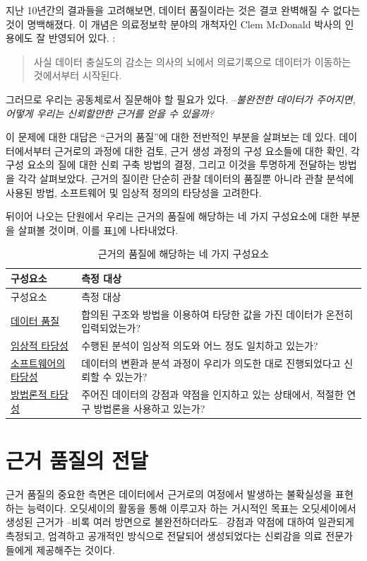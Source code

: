 \documentclass[11pt]{book}
\theoremstyle{definition}
\theoremstyle{definition}
\theoremstyle{definition}
\theoremstyle{remark}
\begin{document}
지난 10년간의 결과들을 고려해보면, 데이터 품질이라는 것은 결코 완벽해질
수 없다는 것이 명백해졌다. 이 개념은 의료정보학 분야의 개척자인 Clem
McDonald 박사의 인용에도 잘 반영되어 있다. :

\begin{quote}
사실 데이터 충실도의 감소는 의사의 뇌에서 의료기록으로 데이터가 이동하는
것에서부터 시작된다. 
\end{quote}

그러므로 우리는 공동체로서 질문해야 할 필요가 있다. --\emph{불완전한
데이터가 주어지면, 어떻게 우리는 신뢰할만한 근거를 얻을 수 있을까?}

이 문제에 대한 대답은 ``근거의 품질''에 대한 전반적인 부분을 살펴보는 데
있다. 데이터에서부터 근거로의 과정에 대한 검토, 근거 생성 과정의 구성
요소들에 대한 확인, 각 구성 요소의 질에 대한 신뢰 구축 방법의 결정,
그리고 이것을 투명하게 전달하는 방법을 각각 살펴보았다. 근거의 질이란
단순히 관찰 데이터의 품질뿐 아니라 관찰 분석에 사용된 방법, 소프트웨어
및 임상적 정의의 타당성을 고려한다. 

뒤이어 나오는 단원에서 우리는 근거의 품질에 해당하는 네 가지 구성요소에
대한 부분을 살펴볼 것이며, 이를 표\ref{tab:evidenceQuality}에
나타내었다.

\begin{longtable}[]{@{}ll@{}}
\caption{\label{tab:evidenceQuality} 근거의 품질에 해당하는 네 가지
구성요소}\tabularnewline
\toprule
구성요소 & 측정 대상\tabularnewline
\midrule
\endfirsthead
\toprule
구성요소 & 측정 대상\tabularnewline
\midrule
\endhead
\href{DataQuality.html}{데이터 품질} & 합의된 구조와 방법을 이용하여
타당한 값을 가진 데이터가 온전히 입력되었는가?\tabularnewline
\href{ClinicalValidity.html}{임상적 타당성} & 수행된 분석이 임상적
의도와 어느 정도 일치하고 있는가?\tabularnewline
\href{SoftwareValidity.html}{소프트웨어의 타당성} & 데이터의 변환과 분석
과정이 우리가 의도한 대로 진행되었다고 신뢰할 수 있는가?\tabularnewline
\href{MethodValidity.html}{방법론적 타당성} & 주어진 데이터의 강점과
약점을 인지하고 있는 상태에서, 적절한 연구 방법론을 사용하고
있는가?\tabularnewline
\bottomrule
\end{longtable}

\section{근거 품질의 전달}\label{--}

근거 품질의 중요한 측면은 데이터에서 근거로의 여정에서 발생하는
불확실성을 표현하는 능력이다. 오딧세이의 활동을 통해 이루고자 하는
거시적인 목표는 오딧세이에서 생성된 근거가 --비록 여러 방면으로
불완전하더라도-- 강점과 약점에 대하여 일관되게 측정되고, 엄격하고
공개적인 방식으로 전달되어 생성되었다는 신뢰감을 의료 전문가들에게
제공해주는 것이다.
\end{document}
